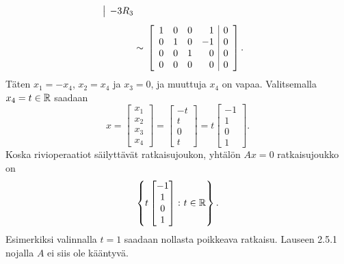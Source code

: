 \documentclass[11pt,a4paper]{amsart}
\begin{document}
\begin{solution}
\[\begin{aligned}
\begin{array}{@{}l@{}}
        \smash{\rowop{-3R_3}}
      \end{array}
      \\[1ex]
      &\sim{}
      \left[
        \begin{array}{rrrr|r}
          1 & 0 & 0 & 1 & 0 \\
          0 & 1 & 0 & -1 & 0 \\
          0 & 0 & 1 & 0 & 0 \\
          0 & 0 & 0 & 0 & 0
        \end{array}
      \right].
    \end{aligned}
  \]
  Täten \(x_1=-x_4\), \(x_2=x_4\) ja \(x_3=0\), ja muuttuja
  \(x_4\) on vapaa. Valitsemalla \(x_4=t\in\mathbb{R}\) saadaan
  \[
    x =
    \begin{bmatrix} x_1 \\ x_2 \\ x_3 \\ x_4
    \end{bmatrix}
    =
    \begin{bmatrix} -t \\ t \\ 0 \\ t
    \end{bmatrix}
    = t
    \begin{bmatrix} -1 \\ 1 \\ 0 \\ 1
    \end{bmatrix}.
  \]
  Koska rivioperaatiot säilyttävät ratkaisujoukon, yhtälön \(Ax=0\)
  ratkaisujoukko on
  \[
    \left\{
      t
      \begin{bmatrix} -1 \\ 1 \\ 0 \\ 1
      \end{bmatrix}
      \colon t\in\mathbb{R}
    \right\}.
  \]
  Esimerkiksi valinnalla \(t=1\) saadaan nollasta poikkeava ratkaisu.
  Lauseen 2.5.1 nojalla \(A\) ei siis ole
  kääntyvä.
\end{solution}
\end{document}
